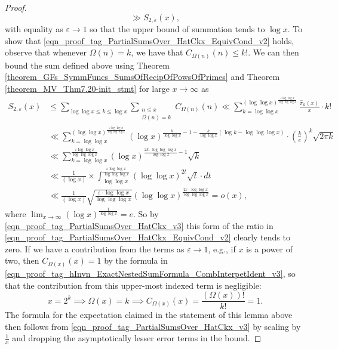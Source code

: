 \documentclass[11pt,reqno,a4letter]{article}
\numberwithin{figure}{section}
\numberwithin{table}{section}
\theoremstyle{plain}
\numberwithin{theorem}{section}
\theoremstyle{definition}
\begin{document}
\begin{proof}
\[     \gg S_{2,\varepsilon}(x),  
\]
with equality as $\varepsilon \rightarrow 1$ so that the upper bound of summation tends to $\log x$. 
To show that \eqref{eqn_proof_tag_PartialSumsOver_HatCkx_EquivCond_v2} holds, 
observe that whenever $\Omega(n) = k$, we have that $C_{\Omega(n)}(n) \leq k!$. 
We can then bound the sum defined above using 
Theorem \ref{theorem_GFs_SymmFuncs_SumsOfRecipOfPowsOfPrimes} and 
Theorem \ref{theorem_MV_Thm7.20-init_stmt} for large $x \rightarrow \infty$ as 
\begin{align*} 
S_{2,\varepsilon}(x) & \leq 
     \sum_{\log\log x \leq k \leq \log x} \sum_{\substack{n \leq x \\ \Omega(n)=k}} C_{\Omega(n)}(n) 
     \ll \sum_{k=\log\log x}^{(\log\log x)^{\frac{\varepsilon \log\log x}{\log\log\log x}}} 
      \frac{\widehat{\pi}_k(x)}{x} \cdot k! \\ 
     & \ll \sum_{k=\log\log x}^{(\log\log x)^{\frac{\varepsilon \log\log x}{\log\log\log x}}} 
     (\log x)^{\frac{k}{\log\log x} - 1 - \frac{k}{\log\log x} \left( 
     \log k - \log\log\log x\right)} \cdot \left(\frac{k}{e}\right)^{k} \sqrt{2\pi k} \\ 
     & \ll \sum_{k=\log\log x}^{\frac{\varepsilon \log\log x}{\log\log\log x}} 
     (\log x)^{\frac{2k \cdot \log\log\log x}{\log\log x} - 1} \sqrt{k} \\ 
     & \ll \frac{1}{(\log x)} \times \int_{\log\log x}^{ 
     \frac{\varepsilon \log\log x}{\log\log\log x}} (\log\log x)^{2t} \sqrt{t} \cdot dt \\ 
     & \ll \frac{1}{(\log x)} \sqrt{\frac{\varepsilon \cdot \log\log x}{\log\log\log x}} 
     (\log\log x)^{\frac{2\varepsilon \cdot \log\log x}{\log\log\log x}} = o(x), 
\end{align*} 
where $\lim_{x \rightarrow \infty} (\log x)^{\frac{1}{\log\log x}} = e$. 
So by \eqref{eqn_proof_tag_PartialSumsOver_HatCkx_v3} this 
form of the ratio in \eqref{eqn_proof_tag_PartialSumsOver_HatCkx_EquivCond_v2} clearly tends to zero. 
If we have a contribution from the terms as $\varepsilon \rightarrow 1$, 
e.g., if $x$ is a power of two, then $C_{\Omega(x)}(x) = 1$ by the formula in 
\eqref{eqn_proof_tag_hInvn_ExactNestedSumFormula_CombInterpetIdent_v3}, so that 
the contribution from this upper-most indexed term is negligible: 
\[
x=2^k \implies \Omega(x) = k \implies C_{\Omega(x)}(x) = \frac{(\Omega(x))!}{k!} = 1. 
\]
The formula for the expectation claimed in the statement of this lemma above then 
follows from \eqref{eqn_proof_tag_PartialSumsOver_HatCkx_v3} by scaling by 
$\frac{1}{x}$ and dropping the asymptotically lesser error terms in the bound. 
\end{proof} 
\end{document}
